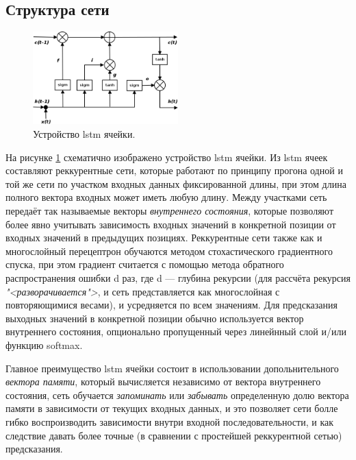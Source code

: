 \documentclass[12pt, oneside]{extbook}
\begin{document}
\begin{flushleft}
\section{Структура сети}
\par
\begin{figure}[h]
\centering
\includegraphics[width=0.5\textwidth]{lstm_cell}
\caption{Устройство lstm ячейки.}
\label{fig:lstm_cell}
\end{figure}
На рисунке \ref{fig:lstm_cell} схематично изображено устройство lstm ячейки. Из lstm ячеек составляют реккурентные сети, которые работают по принципу прогона одной и той же сети по участком входных данных фиксированной длины, при этом длина полного вектора входных может иметь любую длину. Между участками сеть передаёт так называемые векторы \textit{внутреннего состояния}, которые позволяют более явно учитывать зависимость входных значений в конкретной позиции от входных значений в предыдущих позициях. Реккурентные сети также как и многослойный перецептрон обучаются методом стохастического градиентного спуска, при этом градиент считается с помощью метода обратного распространения ошибки d раз, где d --- глубина рекурсии (для рассчёта рекурсия \textit{"<разворачивается">}, и сеть представляется как многослойная с повторяющимися весами), и усредняется по всем значениям. Для предсказания выходных значений в конкретной позиции обычно используется вектор внутреннего состояния, опционально пропущенный через линейнный слой и/или функцию softmax.
\par
Главное преимущество lstm ячейки состоит в использовании допольнительного \textit{вектора памяти}, который вычисляется независимо от вектора внутреннего состояния, сеть обучается \textit{запоминать} или \textit{забывать} определенную долю вектора памяти в зависимости от текущих входных данных, и это позволяет сети болле гибко воспроизводить зависимости внутри входной последовательности, и как следствие давать более точные (в сравнении с простейшей реккурентной сетью) предсказания. 

\end{flushleft}
\end{document}
